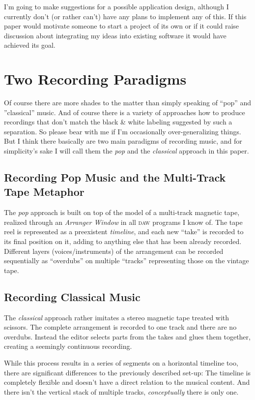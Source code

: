 \documentclass[11pt,a4paper]{article}
\begin{document}
I'm going to make suggestions for a possible application design, although I currently don't (or rather can't) have any plans to implement any of this.
If this paper would motivate someone to start a project of its own or if it could raise discussion about integrating my ideas into existing software it would have achieved its goal.

\section{Two Recording Paradigms}

Of course there are more shades to the matter  than simply speaking of “pop” and ”classical” music.
And of course there is a variety of approaches how to produce recordings that don't match the black \& white labeling suggested by such a separation.
So please bear with me if I'm occasionally over-generalizing things.
But I think there basically are two main paradigms of recording music, and for simplicity's sake I will call them the \emph{pop} and the \emph{classical} approach in this paper.

\subsection{Recording Pop Music and the Multi-Track Tape Metaphor}

The \emph{pop} approach is built on top of the model of a multi-track magnetic tape, realized through an \emph{Arranger Window} in all \textsc{daw} programs I know of.
The tape reel is represented as a preexistent \emph{timeline}, and each new “take” is recorded to its final position on it, adding to anything else that has been already recorded.
Different layers (voices/instruments) of the arrangement can be recorded sequentially as “overdubs” on multiple “tracks” representing those on the vintage tape.

\subsection{Recording Classical Music}
 
The \emph{classical} approach rather imitates a stereo magnetic tape treated with scissors.
The complete arrangement is recorded to one track and there are no overdubs.
Instead the editor selects parts from the takes and glues them together, creating a seemingly continuous recording.

While this process results in a series of segments on a horizontal timeline too, there are significant differences to the previously described set-up:
The timeline is completely flexible and doesn't have a direct relation to the musical content.
And there isn't the vertical stack of multiple tracks, \emph{conceptually} there is only one.
\end{document}

